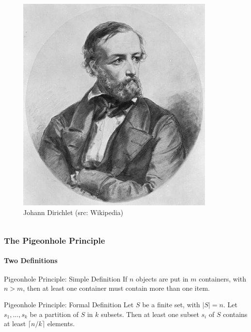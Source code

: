 \documentclass[9pt,    %
    english,            %
    xcolor=table,       %
    envcountsect,        %
    aspectratio=169     %
]{beamer}
\begin{document}
\begin{frame}
\begin{columns}[t]
\begin{column}{.3\textwidth}
\begin{figure}
                \includegraphics[width=\textwidth]{images/dirichlet.jpg}
                \caption{Johann Dirichlet (src: Wikipedia)}
            \end{figure}
        \end{column}
    \end{columns}

\end{frame}

\begin{frame}
    \frametitle{The Pigeonhole Principle}
    \framesubtitle{Two Definitions}

    \begin{block}{Pigeonhole Principle: Simple Definition}
        If $n$ objects are put in $m$ containers, with $n > m$, then at least one container must contain more than one item.
    \end{block}

    \vspace{10pt}

    \begin{alertblock}{Pigeonhole Principle: Formal Definition}
        Let $S$ be a finite set, with $|S| = n$.
        Let $s_1, \dots, s_k$ be a partition of $S$ in $k$ subsets.
        Then at least one subset $s_i$ of $S$ contains at least $\lceil n/k \rceil$ elements.
    \end{alertblock}
\end{frame}
\end{document}
